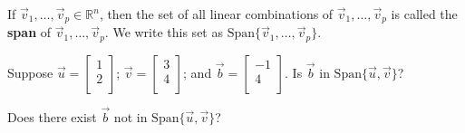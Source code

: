 \begin{enumerate}
\begin{defn}
If $\vec{v}_1, \dots, \vec{v}_p \in \mathbb{R}^n$, then the set of all linear combinations of $\vec{v}_1, \dots, \vec{v}_p$ is called the {\bf span} of $\vec{v}_1, \dots, \vec{v}_p$. We write this set as $\text{Span} \{\vec{v}_1, \dots, \vec{v}_p\}$.
\end{defn}

\Problem 
\Part Suppose $\vec{u} =\begin{bmatrix} 1\\2\\ \end{bmatrix}$;  $\vec{v} =\begin{bmatrix} 3\\4\\ \end{bmatrix}$; and  $\vec{b} =\begin{bmatrix} -1\\4\\ \end{bmatrix}$. Is $\vec{b}$ in $\text{Span} \{ \vec{u}, \vec{v} \}$?

\vfill

\Part Does there exist $\vec{b}$ not in $\text{Span} \{ \vec{u}, \vec{v} \}$?

\vfill

\end{enumerate}

